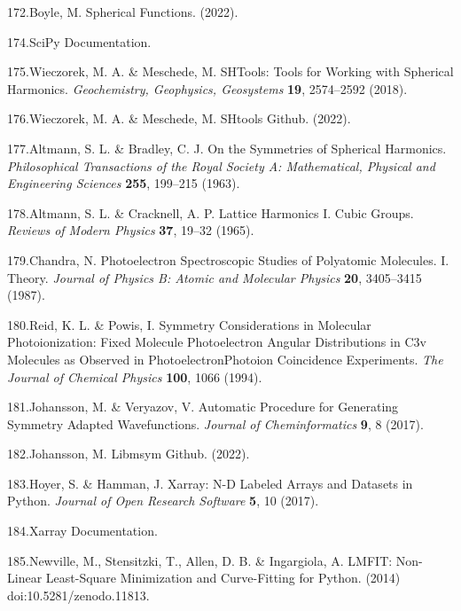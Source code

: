 \documentclass[10pt]{article}
\begin{document}
\label{csl:172}172.Boyle, M. {Spherical {{Functions}}}. (2022).

\label{csl:174}174.{{{SciPy}} Documentation}.

\label{csl:175}175.Wieczorek, M. A. \& Meschede, M. {{{SHTools}}: {{Tools}} for {{Working}} with {{Spherical Harmonics}}}. \textit{Geochemistry, Geophysics, Geosystems} \textbf{19}, 2574–2592 (2018).

\label{csl:176}176.Wieczorek, M. A. \& Meschede, M. {{SHtools Github}}. (2022).

\label{csl:177}177.Altmann, S. L. \& Bradley, C. J. {On the {{Symmetries}} of {{Spherical Harmonics}}}. \textit{Philosophical Transactions of the Royal Society A: Mathematical, Physical and Engineering Sciences} \textbf{255}, 199–215 (1963).

\label{csl:178}178.Altmann, S. L. \& Cracknell, A. P. {Lattice Harmonics {{I}}. {{Cubic}} Groups}. \textit{Reviews of Modern Physics} \textbf{37}, 19–32 (1965).

\label{csl:179}179.Chandra, N. {Photoelectron Spectroscopic Studies of Polyatomic Molecules. {{I}}. {{Theory}}}. \textit{Journal of Physics B: Atomic and Molecular Physics} \textbf{20}, 3405–3415 (1987).

\label{csl:180}180.Reid, K. L. \& Powis, I. {Symmetry Considerations in Molecular Photoionization: {{Fixed}} Molecule Photoelectron Angular Distributions in {{C3v}} Molecules as Observed in Photoelectron\textendash Photoion Coincidence Experiments}. \textit{The Journal of Chemical Physics} \textbf{100}, 1066 (1994).

\label{csl:181}181.Johansson, M. \& Veryazov, V. {Automatic Procedure for Generating Symmetry Adapted Wavefunctions}. \textit{Journal of Cheminformatics} \textbf{9}, 8 (2017).

\label{csl:182}182.Johansson, M. {Libmsym {{Github}}}. (2022).

\label{csl:183}183.Hoyer, S. \& Hamman, J. {Xarray: {{N-D}} Labeled {{Arrays}} and {{Datasets}} in {{Python}}}. \textit{Journal of Open Research Software} \textbf{5}, 10 (2017).

\label{csl:184}184.{Xarray Documentation}.

\label{csl:185}185.Newville, M., Stensitzki, T., Allen, D. B. \& Ingargiola, A. {{{LMFIT}}: {{Non-Linear Least-Square Minimization}} and {{Curve-Fitting}} for {{Python}}}. (2014) doi:10.5281/zenodo.11813.
\end{document}
